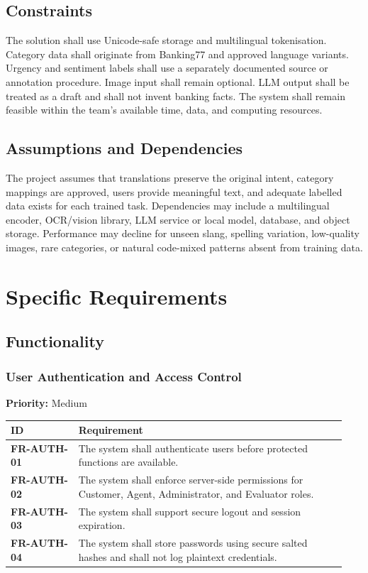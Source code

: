 \documentclass[10pt,letterpaper]{article}
\newcommand{\req}[1]{\textbf{#1}}
\newcommand{\priority}[1]{\textbf{Priority:} #1}
\newenvironment{requirements}{%
  \small\setlength{\tabcolsep}{4pt}%
  \begin{longtable}{|L{0.19\linewidth}|L{0.75\linewidth}|}
  \hline\textbf{ID} & \textbf{Requirement}\\\hline\endhead}{\hline\end{longtable}}
\newenvironment{templatebody}{\par\justifying\setlength{\emergencystretch}{3em}}{\par}
\begin{document}
\begin{templatebody}
\subsection*{Constraints}
The solution shall use Unicode-safe storage and multilingual tokenisation. Category data shall originate from Banking77 and approved language variants. Urgency and sentiment labels shall use a separately documented source or annotation procedure. Image input shall remain optional. LLM output shall be treated as a draft and shall not invent banking facts. The system shall remain feasible within the team's available time, data, and computing resources.

\subsection*{Assumptions and Dependencies}
The project assumes that translations preserve the original intent, category mappings are approved, users provide meaningful text, and adequate labelled data exists for each trained task. Dependencies may include a multilingual encoder, OCR/vision library, LLM service or local model, database, and object storage. Performance may decline for unseen slang, spelling variation, low-quality images, rare categories, or natural code-mixed patterns absent from training data.

\section{Specific Requirements}

\subsection{Functionality}

\subsubsection{User Authentication and Access Control}
\priority{Medium}
\begin{requirements}
\req{FR-AUTH-01} & The system shall authenticate users before protected functions are available.\\
\req{FR-AUTH-02} & The system shall enforce server-side permissions for Customer, Agent, Administrator, and Evaluator roles.\\
\req{FR-AUTH-03} & The system shall support secure logout and session expiration.\\
\req{FR-AUTH-04} & The system shall store passwords using secure salted hashes and shall not log plaintext credentials.\\
\end{requirements}


\end{templatebody}
\end{document}

